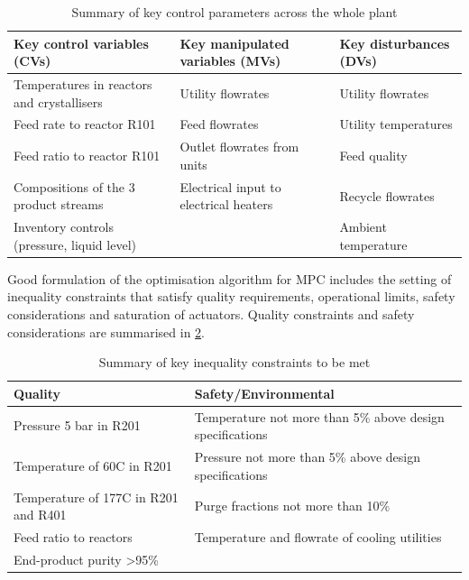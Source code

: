 \begin{table}[h]
\centering
    \caption{Summary of key control parameters across the whole plant}
    \label{tab:key-parameters}
\begin{tabular}{@{}lll@{}}
\toprule
\textbf{Key control variables (CVs)}        & \textbf{Key manipulated variables (MVs)} & \textbf{Key disturbances (DVs)} \\ \midrule
Temperatures in reactors and crystallisers  & Utility flowrates                        & Utility flowrates         \\
Feed rate to reactor R101                   & Feed flowrates                           & Utility temperatures      \\
Feed ratio to reactor R101                  & Outlet flowrates from units              & Feed quality              \\
Compositions of the 3 product streams       & Electrical input to electrical heaters   & Recycle flowrates         \\
Inventory controls (pressure, liquid level) &                                          & Ambient temperature       \\ \bottomrule
\end{tabular}
\end{table}

Good formulation of the optimisation algorithm for MPC includes the setting of inequality constraints that satisfy quality requirements, operational limits, safety considerations and saturation of actuators. Quality constraints and safety considerations are summarised in \cref{tab:key-constraints}.

\begin{table}[h]
\centering
    \caption{Summary of key inequality constraints to be met}
    \label{tab:key-constraints}
\begin{tabular}{@{}ll@{}}
\toprule
\textbf{Quality}                      & \textbf{Safety/Environmental}                             \\ \midrule
Pressure 5 bar in R201                & Temperature not more than 5\% above design specifications \\
Temperature of 60C in R201            & Pressure not more than 5\% above design specifications    \\
Temperature of 177C in R201 and R401  & Purge fractions not more than 10\%                        \\
Feed ratio to reactors                & Temperature and flowrate of cooling utilities             \\
End-product purity \textgreater{}95\% &                                                           \\ \bottomrule
\end{tabular}
\end{table}

